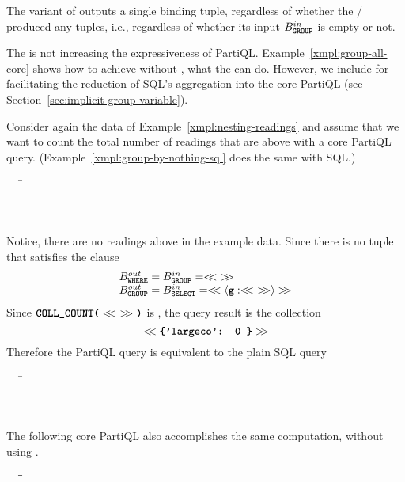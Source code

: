 The  variant of  outputs a single binding tuple,
regardless of whether the / produced any tuples, i.e.,
regardless of whether its input $B^{in}_{\texttt{\textbf{GROUP}}}$ is empty or not.

The  is not increasing the expressiveness of PartiQL.
Example~\ref{xmpl:group-all-core} shows how to achieve without ,
what the  can do. However, we include  for
facilitating the reduction of SQL's aggregation into the core PartiQL (see
Section~\ref{sec:implicit-group-variable}). 
%
\begin{example}
\label{xmpl:group-all-core}
Consider again the  data of Example~\ref{xmpl:nesting-readings} and
assume that we want to count the total number of readings that are above
 with a core PartiQL query. (Example~\ref{xmpl:group-by-nothing-sql}
does the same with SQL.) 
\begin{tabbing}
\ \ \ \=\\
\>\\
\>\\
\> 
\end{tabbing}
Notice, there are no readings above  in the example data. Since there is
no tuple that satisfies the  clause
\[\begin{array}{l}
B^{out}_{\gl{WHERE}} = B^{in}_{\gl{GROUP}} = \ob\ \cb \\
B^{out}_{\gl{GROUP}} = B^{in}_{\gl{SELECT}} = \ob \langle \gt{g}: \ob\ \cb \rangle \cb
\end{array}
\]
Since $\texttt{\textbf{COLL\_COUNT(}}<\!\!<\ >\!\!>\texttt{\textbf{)}}$ is , the query result is the collection 
\[<\!\!< \texttt{\textbf{\{'largeco': 0 \}}} >\!\!> \]
Therefore the PartiQL query is equivalent to the plain SQL query
\begin{tabbing}
\ \ \ \=\\
\>\\
\>\\
\end{tabbing}
The following core PartiQL also accomplishes the same computation, without using
.
\begin{tabbing}
\ \ \ \=\=\\
\>\>\\
\>\>\\
\>\>\gl{)}\\
\>\gl{\}}
\end{tabbing}
\end{example}

